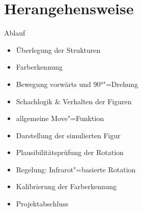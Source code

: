 
\section{Herangehensweise}


\begin{frame}{Ablauf}
    \begin{itemize}
        \item Überlegung der Strukturen
        \item Farberkennung
        \item Bewegung vorwärts und 90°"=Drehung
        \item Schachlogik \& Verhalten der Figuren
        \item allgemeine Move"=Funktion
        \item Darstellung der simulierten Figur
        \item Plausibilitätsprüfung der Rotation
        \item Regelung: Infrarot"=basierte Rotation
        \item Kalibrierung der Farberkennung
        \item Projektabschluss
    \end{itemize}
\end{frame}
